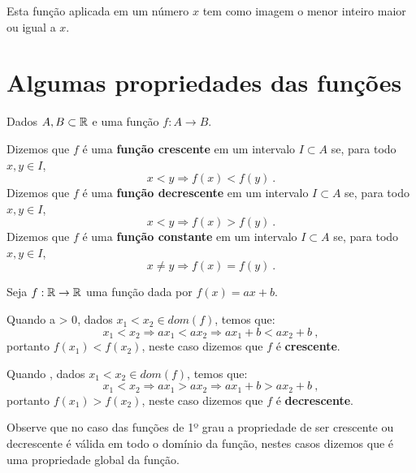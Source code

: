   Esta função aplicada em um número $x$ tem como imagem o menor inteiro maior ou igual a $x$.

  \section{Algumas propriedades das funções}

   \vskip0.3cm
 \colorbox{azul}{
 \begin{minipage}{0.9\linewidth}
 \begin{center}
  Dados $A, B \subset \mathbb{R}$ e uma função $f: A \rightarrow B$.

  Dizemos que $f$ é uma \textbf{função crescente} em um intervalo $I \subset A$ se, para todo $x, y \in I$,
  \[ x < y \Rightarrow f(x) < f(y) \ .\]
  Dizemos que $f$ é uma \textbf{função decrescente} em um intervalo $I \subset A$ se, para todo $x, y \in I$,
  \[x < y \Rightarrow f(x) > f(y) \ .\]
  Dizemos que $f$ é uma \textbf{função constante} em um intervalo $I \subset A$ se, para todo $x, y \in I$,
  \[x \neq y \Rightarrow f(x) = f(y) \ .\]
 \end{center}
 \end{minipage}}
 \vskip0.3cm

 \begin{exem}
 Seja $f: \mathbb{R} \to \mathbb{R}$ uma função dada por $f(x)= ax + b$.

 Quando {a > 0}, dados $x_1 < x_2 \in dom(f)$, temos que:
 \[x_1 < x_2 \Rightarrow ax_1 < ax_2 \Rightarrow ax_1 + b < ax_2 + b \ ,\]
  portanto $f(x_1) < f(x_2)$, neste caso dizemos que $f$ é \textbf{crescente}.

 Quando , dados $x_1 < x_2 \in dom(f)$, temos que:
 \[x_1 < x_2 \Rightarrow ax_1 > ax_2 \Rightarrow ax_1 + b > ax_2 + b \ ,\]
 portanto $f(x_1) > f(x_2)$, neste caso dizemos que $f$ é \textbf{decrescente}.

 Observe que no caso das funções de 1º grau a propriedade de ser crescente ou decrescente é válida em todo o domínio da função, nestes casos dizemos que é uma propriedade global da função.
 \end{exem}

